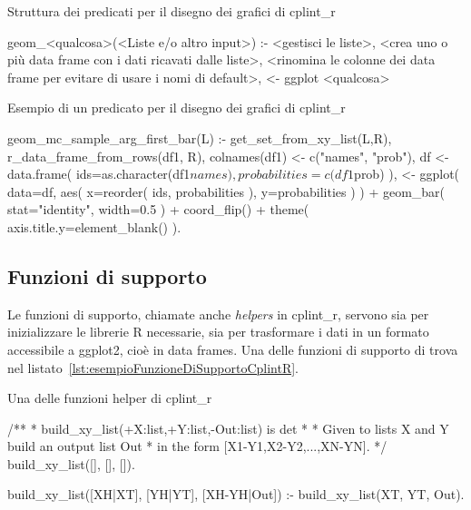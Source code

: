 \documentclass[10pt,titlepage,twoside,a4paper]{report}
\newenvironment{code}{\singlespacing\captionsetup{type=listing}}{}
\begin{document}
\begin{minipage}{\textwidth}
\centering
\begin{code}
    \caption{Struttura dei predicati per il disegno dei grafici di cplint\_r}
    \label{lst:strutturaPredicatiGeomCplintR}
    \begin{prologcode*}{}
geom_<qualcosa>(<Liste e/o altro input>) :-
    <gestisci le liste>,
    <crea uno o più data frame con i dati ricavati dalle liste>,
    <rinomina le colonne dei data frame per evitare di usare i nomi di default>,
    <- ggplot <qualcosa>
    \end{prologcode*}
\end{code}
\end{minipage}

\begin{minipage}{\textwidth}
\centering
\begin{code}
    \caption{Esempio di un predicato per il disegno dei grafici di cplint\_r}
    \label{lst:esempioPredicatoGeomCplintR}
    \begin{prologcode*}{}
geom_mc_sample_arg_first_bar(L) :-
    get_set_from_xy_list(L,R),
    r_data_frame_from_rows(df1, R),
    colnames(df1) <- c("names", "prob"),
    df <- data.frame(
        ids=as.character(df1$names),
        probabilities=c(df1$prob)
    ),
    <- ggplot(
        data=df,
        aes(
            x=reorder(
                ids,
                probabilities
            ),
            y=probabilities
        )
    ) + geom_bar(
        stat="identity",
        width=0.5
    )
    + coord_flip() + theme(
        axis.title.y=element_blank()
    ).
\end{prologcode*}
\end{code}
\end{minipage}

\subsection{Funzioni di supporto}
Le funzioni di supporto, chiamate anche \emph{helpers} in cplint\_r, servono 
sia per inizializzare le librerie R necessarie, sia per trasformare i dati in 
un formato accessibile a ggplot2, cioè in data frames. Una delle funzioni di
supporto di trova nel listato~\ref{lst:esempioFunzioneDiSupportoCplintR}.

\begin{minipage}{\textwidth}
\centering
\begin{code}
    \caption{Una delle funzioni helper di cplint\_r}
    \label{lst:esempioFunzioneDiSupportoCplintR}
    \begin{prologcode*}{}
/**
 * build_xy_list(+X:list,+Y:list,-Out:list) is det
 *
 * Given to lists X and Y build an output list Out
 * in the form [X1-Y1,X2-Y2,...,XN-YN].
 */
build_xy_list([], [], []).

build_xy_list([XH|XT], [YH|YT], [XH-YH|Out]) :-
        build_xy_list(XT, YT, Out).
    \end{prologcode*}
\end{code}
\end{minipage}
\end{document}

